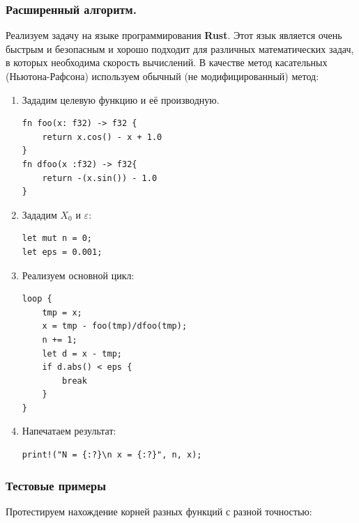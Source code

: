 \documentclass{article}
\begin{document}
			\subsubsection{Расширенный алгоритм.}
			
			Реализуем задачу на языке программирования \textbf{Rust}. Этот язык является очень быстрым и безопасным и хорошо подходит для различных математических задач, в которых необходима скорость вычислений. В качестве метод касательных (Ньютона-Рафсона) используем обычный (не модифицированный) метод:
			
			\begin{enumerate}
					\item Зададим целевую функцию и её производную.			
					\lstset {language=C++}
					\begin{lstlisting}
fn foo(x: f32) -> f32 {
    return x.cos() - x + 1.0
}
fn dfoo(x :f32) -> f32{
	return -(x.sin()) - 1.0
}

					\end{lstlisting}
					
					\item Зададим $X_0$ и $\varepsilon$:
					\begin{lstlisting}
let mut n = 0;
let eps = 0.001;
					\end{lstlisting}
					
					\item Реализуем основной цикл:
					\begin{lstlisting}
loop {
    tmp = x;
   	x = tmp - foo(tmp)/dfoo(tmp);
   	n += 1;
   	let d = x - tmp;
   	if d.abs() < eps {
   	    break
   	}
}
					\end{lstlisting}
					
					\item Напечатаем результат:
					\begin{lstlisting}
print!("N = {:?}\n x = {:?}", n, x);
					\end{lstlisting}					
					
				
				\end{enumerate}
				
				
			\subsubsection{Тестовые примеры}
			
			Протестируем нахождение корней разных функций с разной точностью:\\
			
\end{document}
